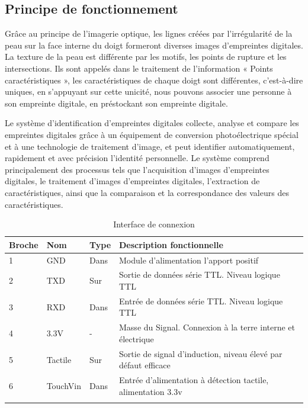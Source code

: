     \subsection{Principe de fonctionnement}
    Grâce au principe de l’imagerie optique, les lignes créées par l’irrégularité de la peau sur la face interne du doigt formeront diverses images d’empreintes digitales. La texture de la peau est différente par les motifs, les points de rupture et les intersections. Ils sont appelés dans le traitement de l’information « Points caractéristiques », les caractéristiques de chaque doigt sont différentes, c’est-à-dire uniques, en s’appuyant sur cette unicité, nous pouvons associer une personne à son empreinte digitale, en préstockant son empreinte digitale.
    
    Le système d’identification d’empreintes digitales collecte, analyse et compare les empreintes digitales grâce à un équipement de conversion photoélectrique spécial et à une technologie de traitement d’image, et peut identifier automatiquement, rapidement et avec précision l’identité personnelle. Le système comprend principalement des processus tels que l’acquisition d’images d’empreintes digitales, le traitement d’images d’empreintes digitales, l’extraction de caractéristiques, ainsi que la comparaison et la correspondance des valeurs des caractéristiques.\cite{34}
    \begin{longtable}{|p{1.3cm}|p{1.8cm}|p{1.8cm}|p{10cm}|}
                \endhead
                \endfoot
                \hline
                Broche & Nom & Type & Description fonctionnelle \\
                \hline
                1 & GND & Dans & Module d'alimentation l'apport positif \\
                \hline
                2 & TXD & Sur & Sortie de données série TTL. Niveau logique TTL \\
                \hline
                3 & RXD & Dans & Entrée de données série TTL. Niveau logique TTL \\
                \hline
                4 & 3.3V & - & Masse du Signal. Connexion à la terre interne et électrique 
                \\
                \hline
                5 & Tactile & Sur & Sortie de signal d'induction, niveau élevé par défaut efficace 
                \\
                \hline
                6 & TouchVin & Dans & Entrée d'alimentation à détection tactile, alimentation 3.3v 
                \\
                \hline
                \caption{Interface de connexion}\cite{34}\\
        \end{longtable}   

